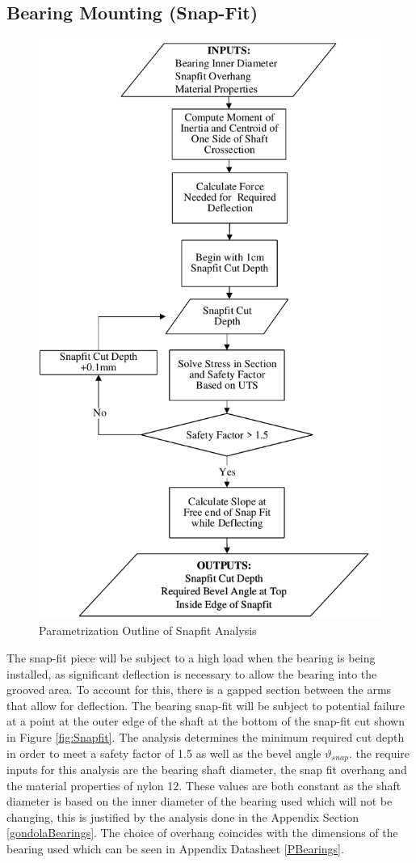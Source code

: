 \documentclass[../main.tex]{subfiles}
\begin{document}
\subsection{Bearing Mounting (Snap-Fit)} \label{snapFit}
\begin{figure}[H]
	\centering
	\includegraphics[width=0.75 \textwidth]{img/Paramaterization/snapFit.pdf}
	\caption{Parametrization Outline of Snapfit Analysis}
	\label{fig:snapParamaterization}
\end{figure}

The snap-fit piece will be subject to a high load when the bearing is being installed, as significant deflection is necessary to allow the bearing into the grooved area. To account for this, there is a gapped section between the arms that allow for deflection. The bearing snap-fit will be subject to potential failure at a point at the outer edge of the shaft at the bottom of the snap-fit cut shown in Figure \ref{fig:Snapfit}. The analysis determines the minimum required cut depth in order to meet a safety factor of 1.5 as well as the bevel angle $\vartheta_{snap}$. the require inputs for this analysis are the bearing shaft diameter, the snap fit overhang and the material properties of nylon 12. These values are both constant as the shaft diameter is based on the inner diameter of the bearing used which will not be changing, this is justified by the analysis done in the Appendix Section \ref{gondolaBearings}. The choice of overhang coincides with the dimensions of the bearing used which can be seen in Appendix Datasheet \ref{PBearings}.
\end{document}

